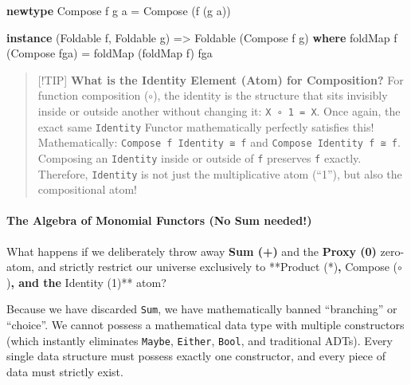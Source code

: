 \documentclass[
]{article}
\newenvironment{Shaded}{}{}
\newcommand{\DataTypeTok}[1]{\textcolor[rgb]{0.56,0.13,0.00}{#1}}
\newcommand{\FunctionTok}[1]{\textcolor[rgb]{0.02,0.16,0.49}{#1}}
\newcommand{\KeywordTok}[1]{\textcolor[rgb]{0.00,0.44,0.13}{\textbf{#1}}}
\newcommand{\NormalTok}[1]{#1}
\newcommand{\OtherTok}[1]{\textcolor[rgb]{0.00,0.44,0.13}{#1}}
\begin{document}
\begin{Shaded}
\begin{Highlighting}[]
\KeywordTok{newtype} \DataTypeTok{Compose}\NormalTok{ f g a }\OtherTok{=} \DataTypeTok{Compose}\NormalTok{ (f (g a))}

\KeywordTok{instance}\NormalTok{ (}\DataTypeTok{Foldable}\NormalTok{ f, }\DataTypeTok{Foldable}\NormalTok{ g) }\OtherTok{=\textgreater{}} \DataTypeTok{Foldable}\NormalTok{ (}\DataTypeTok{Compose}\NormalTok{ f g) }\KeywordTok{where}
    \FunctionTok{foldMap}\NormalTok{ f (}\DataTypeTok{Compose}\NormalTok{ fga) }\OtherTok{=} \FunctionTok{foldMap}\NormalTok{ (}\FunctionTok{foldMap}\NormalTok{ f) fga}
\end{Highlighting}
\end{Shaded}

\begin{quote}
{[}!TIP{]} \textbf{What is the Identity Element (Atom) for Composition?}
For function composition (\(\circ\)), the identity is the structure that
sits invisibly inside or outside another without changing it:
\texttt{X\ ∘\ 1\ =\ X}. Once again, the exact same \texttt{Identity}
Functor mathematically perfectly satisfies this! Mathematically:
\texttt{Compose\ f\ Identity\ ≅\ f} and
\texttt{Compose\ Identity\ f\ ≅\ f}. Composing an \texttt{Identity}
inside or outside of \texttt{f} preserves \texttt{f} exactly. Therefore,
\texttt{Identity} is not just the multiplicative atom (``1''), but also
the compositional atom!
\end{quote}

\paragraph{The Algebra of Monomial Functors (No Sum
needed!)}\label{the-algebra-of-monomial-functors-no-sum-needed}

What happens if we deliberately throw away \textbf{Sum (+)} and the
\textbf{Proxy (0)} zero-atom, and strictly restrict our universe
exclusively to **Product (*)\textbf{, }Compose (\(\circ\))\textbf{, and
the }Identity (1)** atom?

Because we have discarded \texttt{Sum}, we have mathematically banned
``branching'' or ``choice''. We cannot possess a mathematical data type
with multiple constructors (which instantly eliminates \texttt{Maybe},
\texttt{Either}, \texttt{Bool}, and traditional ADTs). Every single data
structure must possess exactly one constructor, and every piece of data
must strictly exist.
\end{document}
